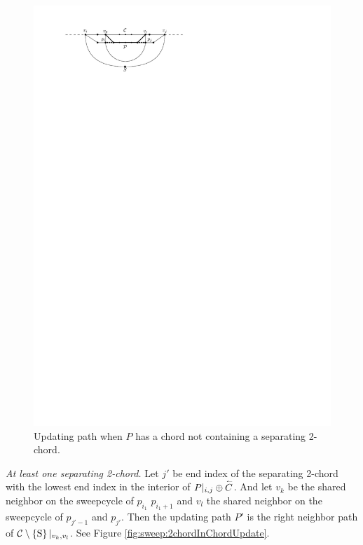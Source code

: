     \begin{figure}[h]
      \centering
      \includegraphics[scale=1]{unifiedAlgo/img/sweep/chordUpdate}
      \caption{Updating path when $P$ has a chord not containing a separating 2-chord.}
      \label{fig:sweep:chordUpdate}
    \end{figure}

    \emph{At least one separating 2-chord.}
      Let $j'$ be end index of the separating 2-chord with the lowest end index in the interior of $P|_{i, j} \oplus \accentset{\leftharpoonup}{{C}}$. And let $v_k$ be the shared neighbor on the sweepcycle of $p_{i_1}$ $p_{i_1 +1}$ and $v_l$ the shared neighbor on the sweepcycle  of $p_{j' -1}$ and $p_{j'}$.
      Then the updating path $P'$ is the right neighbor path of $\mathcal{C} \setminus \left\lbrace {\mathrm{S}} \right\rbrace|_{v_k, v_l}$. See Figure \ref{fig:sweep:2chordInChordUpdate}.


